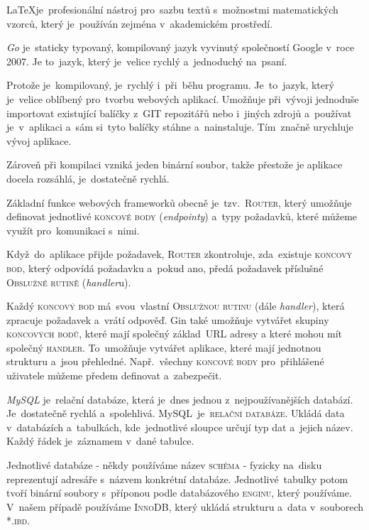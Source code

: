 \documentclass[14pt,a4paper]{article}
\begin{document}
            \LaTeX je~profesionální nástroj pro~sazbu textů s~možnostmi matematických vzorců, který je~používán zejména v~akademickém prostředí.\cite{Rybicka2003:latex}

            \emph{Go} je~staticky typovaný, kompilovaný jazyk vyvinutý společností Google v~roce 2007. Je to~jazyk, který je~velice rychlý a~jednoduchý na~psaní.

            Protože je~kompilovaný, je~rychlý i~při~běhu programu. Je~to~jazyk, který je~velice oblíbený pro~tvorbu webových aplikací. Umožňuje při~vývoji jednoduše importovat existující balíčky z~GIT repozitářů nebo i~jiných zdrojů a~používat je~v~aplikaci a~sám si~tyto balíčky stáhne a~nainstaluje. Tím~značně urychluje vývoj aplikace.

            Zároveň při kompilaci vzniká jeden binární soubor, takže přestože je aplikace docela rozsáhlá, je~dostatečně rychlá.

            Základní funkce webových frameworků obecně je~tzv.~\textsc{Router}, který umožňuje definovat jednotlivé \textsc{koncové body} (\emph{endpointy}) a~typy požadavků, které můžeme využít pro~komunikaci s~nimi.
            
            Když~do~aplikace přijde požadavek, \textsc{Router} zkontroluje, zda~existuje \textsc{koncový bod}, který odpovídá požadavku a~pokud ano, předá požadavek příslušné \textsc{Obslužné rutině} (\emph{handler}u).

            Každý \textsc{koncový bod} má~svou~vlastní \textsc{Obslužnou rutinu} (dále \emph{handler}), která zpracuje požadavek a~vrátí odpověď.
            Gin také umožňuje vytvářet skupiny \textsc{koncových bodů}, které mají společný základ~URL adresy a které mohou mít společný \textsc{handler}.
            To~umožňuje vytvářet aplikace, které mají jednotnou strukturu a~jsou přehledné. Např.~všechny \textsc{koncové body} pro~přihlášené
            uživatele můžeme předem definovat a~zabezpečit.
            
            \emph{MySQL} je~relační databáze, která je~dnes jednou z~nejpoužívanějších databází. Je~dostatečně rychlá a~spolehlivá. \cite{databases21}
            MySQL~je~\textsc{relační databáze}. Ukládá data v~databázích a~tabulkách, kde~jednotlivé sloupce určují typ dat a~jejich název. Každý řádek je~záznamem v~dané tabulce.
            
            Jednotlivé databáze - někdy používáme název \textsc{schéma} - fyzicky na~disku reprezentují adresáře s~názvem konkrétní databáze. Jednotlivé~tabulky potom tvoří binární soubory s~příponou podle databázového \textsc{enginu}, který používáme. V~našem případě používáme \textsc{InnoDB}, který ukládá strukturu a~data v~souborech \textsc{*.ibd}. \cite{MySQLInnoDB}
            
\end{document}
